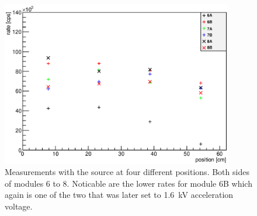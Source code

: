     \begin{figure}
		\centering
		\includegraphics[width = 0.9\textwidth]{graphics/analysis/678final.eps}
  	\caption[Testing of muon modules with Sr source - Modules 6 - 8]{Measurements with the source at four different positions. Both sides of modules 6 to 8. Noticable are the lower rates for module 6B which again is one of the two that was later set to \SI{1.6}{\kilo\volt} acceleration voltage. }
  	\label{fig:SrRatesPMT678}
  \end{figure}

